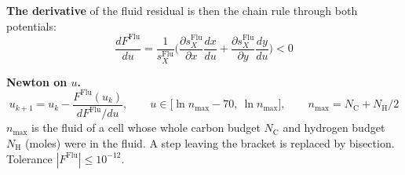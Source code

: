 \documentclass[11pt]{article}
\begin{document}
{\textbf{The derivative} of the fluid residual is then the chain rule through both potentials:
\begin{equation}
  \frac{dF^{\mathrm{Flu}}}{du}=\frac{1}{s_X^{\mathrm{Flu}}}\Big(\frac{\partial s_X^{\mathrm{Flu}}}{\partial x}\frac{dx}{du}+\frac{\partial s_X^{\mathrm{Flu}}}{\partial y}\frac{dy}{du}\Big)<0
\end{equation}

\textbf{Newton on $u$.}
\begin{equation}
  u_{k+1}=u_k-\frac{F^{\mathrm{Flu}}(u_k)}{dF^{\mathrm{Flu}}/du},\qquad u\in\big[\ln n_{\max}-70,\ \ln n_{\max}\big],\qquad n_{\max}=N_{\mathrm C}+N_{\mathrm H}/2
\end{equation}
$n_{\max}$ is the fluid of a cell whose whole carbon budget $N_{\mathrm C}$ and hydrogen budget $N_{\mathrm H}$ (moles) were in the fluid. A step leaving the bracket is replaced by bisection. Tolerance $|F^{\mathrm{Flu}}|\le10^{-12}$.
}

\vspace*{\fill}
\clearpage
\end{document}
